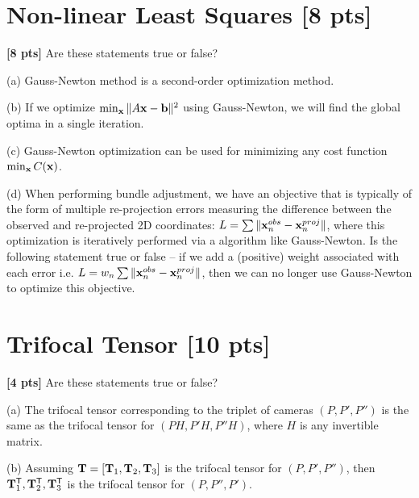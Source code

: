 \documentclass[11pt,addpoints,answers]{exam}
\numberwithin{equation}{section} %
\numberwithin{figure}{section} %
\numberwithin{table}{section} %
\begin{document}
\begin{questions}
\begin{tcolorbox}[fit,height=4.5cm, width=\textwidth, blank, borderline={0.5pt}{-2pt},halign=left, valign=center, nobeforeafter]

\end{tcolorbox}

\section{Non-linear Least Squares [8 pts]}

\question \textbf{[8 pts]} Are these statements true or false?  

(a) Gauss-Newton method is a second-order optimization method.

(b) If we optimize $\min_{\mathbf{x}} \|A\mathbf{x}-\mathbf{b}\|^2$ using Gauss-Newton, we will find the global optima in a single iteration. 

(c) Gauss-Newton optimization can be used for minimizing any cost function $\min_{\mathbf{x}} C(\mathbf{x})$.

(d) When performing bundle adjustment, we have an objective that is typically of the form of multiple re-projection errors measuring the difference between the observed and re-projected 2D coordinates: $L = \sum \| \mathbf{x}^{obs}_{n} - \mathbf{x}^{proj}_n \|$, where this optimization is iteratively performed via a algorithm like Gauss-Newton. Is the following statement true or false -- if we  add a (positive) weight associated with each error i.e. $L = w_n \sum \| \mathbf{x}^{obs}_{n} - \mathbf{x}^{proj}_n \|$, then we can no longer use Gauss-Newton to optimize this objective.

\begin{tcolorbox}[fit,height=5cm, width=\textwidth, blank, borderline={0.5pt}{-2pt},halign=left, valign=center, nobeforeafter]


\end{tcolorbox}

\newpage

\section{Trifocal Tensor [10 pts]}

\question \textbf{[4 pts]} Are these statements true or false?  

(a) The trifocal tensor corresponding to the triplet of cameras $(P, P', P'')$ is the same as the trifocal tensor for $(PH, P'H, P''H)$, where $H$ is any invertible matrix.

(b) Assuming $\mathbf{T} = [\mathbf{T}_1, \mathbf{T}_2, \mathbf{T}_3]$ is the trifocal tensor for $(P, P', P'')$, then $ \mathbf{T}_1^{\mathsf{T}}, \mathbf{T}_2^{\mathsf{T}}, \mathbf{T}_3^{\mathsf{T}}$ is the trifocal tensor for $(P, P'', P')$. 


\end{questions}
\end{document}
